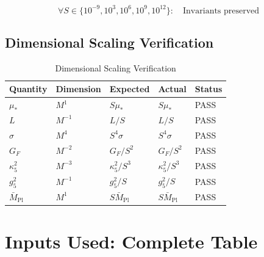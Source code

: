 \documentclass[11pt,a4paper]{article}
\theoremstyle{definition}
\begin{document}
\begin{equation}
\label{eq:multi_scale_result}
\forall S \in \{10^{-9}, 10^3, 10^6, 10^9, 10^{12}\}: \quad \text{Invariants preserved}
\end{equation}

\subsection{Dimensional Scaling Verification}
\label{subsec:dim_scale_verify}

\begin{table}[h]
\centering
\caption{Dimensional Scaling Verification}
\label{tab:dim_scale}
\begin{tabular}{@{}lllll@{}}
\toprule
\textbf{Quantity} & \textbf{Dimension} & \textbf{Expected} & \textbf{Actual} & \textbf{Status} \\
\midrule
$\mu_*$ & $M^1$ & $S\mu_*$ & $S\mu_*$ & PASS \\
$L$ & $M^{-1}$ & $L/S$ & $L/S$ & PASS \\
$\sigma$ & $M^4$ & $S^4\sigma$ & $S^4\sigma$ & PASS \\
$G_F$ & $M^{-2}$ & $G_F/S^2$ & $G_F/S^2$ & PASS \\
$\kappa_5^2$ & $M^{-3}$ & $\kappa_5^2/S^3$ & $\kappa_5^2/S^3$ & PASS \\
$g_5^2$ & $M^{-1}$ & $g_5^2/S$ & $g_5^2/S$ & PASS \\
$\bar{M}_{\text{Pl}}$ & $M^1$ & $S\bar{M}_{\text{Pl}}$ & $S\bar{M}_{\text{Pl}}$ & PASS \\
\bottomrule
\end{tabular}
\end{table}

\section{Inputs Used: Complete Table}
\label{app:inputs}
\end{document}
